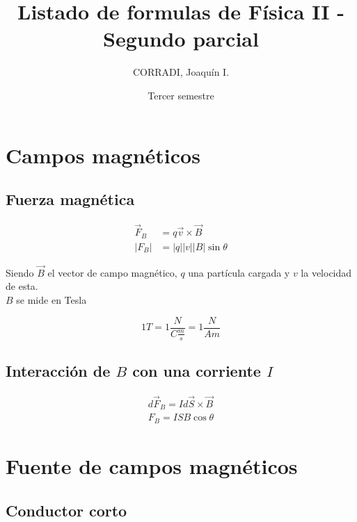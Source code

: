 \documentclass[a4, 12pt]{report}
\title{Listado de formulas de Física II - Segundo parcial}
\date{Tercer semestre}
\author{CORRADI, Joaquín I.}
\begin{document}
  \maketitle
  \setcounter{tocdepth}{5}
  \tableofcontents
  \newpage

  \chapter*{Campos magnéticos}

    \section*{Fuerza magnética}
      
      \begin{align*}
        \vec{F}_B&=q\vec{v}\times\vec{B}\\
        |F_B|&=|q||v||B|\sin{\theta}
      \end{align*}

      Siendo $\vec{B}$ el vector de campo magnético, $q$ una partícula cargada
      y $v$ la velocidad de esta.\\
      \indent$B$ se mide en Tesla

      \begin{equation*}
        1T=1\frac{N}{C\frac{m}{s}}=1\frac{N}{Am}
      \end{equation*}

    \section*{Interacción de $B$ con una corriente $I$}

    \begin{align*}
      d\vec{F}_B=Id\vec{S}\times\vec{B}\\
      F_B=ISB\cos{\theta}
    \end{align*}

  \chapter*{Fuente de campos magnéticos}

    \section*{Conductor corto}
\end{document}
